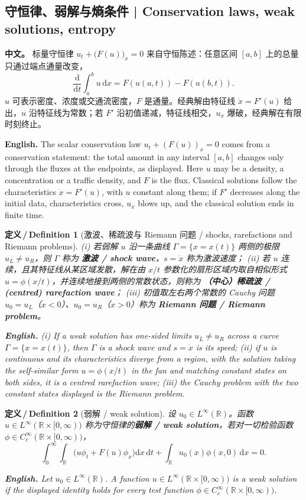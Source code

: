 \documentclass[UTF8,11pt,a4paper]{ctexart}
\newcommand{\APS}[2]{\par\noindent\textbf{中文。} #1\par\noindent\textbf{English.} #2\par\smallskip}
\newcommand{\EN}[1]{\par\noindent \textbf{English.} #1\par}
\newtheorem{definition}{定义\,/\,Definition}[section]
\newcommand{\R}{\mathbb{R}}
\newcommand{\dd}{\mathrm{d}}
\begin{document}
\subsection{守恒律、弱解与熵条件 | Conservation laws, weak solutions, entropy}
\APS{标量守恒律 $u_t+\bigl(F(u)\bigr)_x=0$ 来自守恒陈述：任意区间 $[a,b]$ 上的总量只通过端点通量改变，
\[
\frac{\dd}{\dd t}\int_a^b u\,\dd x=F(u(a,t))-F(u(b,t)).
\]
$u$ 可表示密度、浓度或交通流密度，$F$ 是通量。经典解由特征线 $\dot x=F'(u)$ 给出，$u$ 沿特征线为常数；若 $F'$ 沿初值递减，特征线相交，$u_x$ 爆破，经典解在有限时刻终止。}{The scalar conservation law $u_t+(F(u))_x=0$ comes from a conservation statement: the total amount in any interval $[a,b]$ changes only through the fluxes at the endpoints, as displayed. Here $u$ may be a density, a concentration or a traffic density, and $F$ is the flux. Classical solutions follow the characteristics $\dot x=F'(u)$, with $u$ constant along them; if $F'$ decreases along the initial data, characteristics cross, $u_x$ blows up, and the classical solution ends in finite time.}

\begin{definition}[激波、稀疏波与 Riemann 问题 / shocks, rarefactions and Riemann problems]\label{def:shock}
(i) 若弱解 $u$ 沿一条曲线 $\Gamma=\{x=x(t)\}$ 两侧的极限 $u_L\ne u_R$，则 $\Gamma$ 称为 \textbf{激波 / shock wave}，$s=\dot x$ 称为激波速度；
(ii) 若 $u$ 连续，且其特征线从某区域发散，解在由 $x/t$ 参数化的扇形区域内取自相似形式 $u=\phi(x/t)$，并连续地接到两侧的常数状态，则称为 \textbf{（中心）稀疏波 / (centred) rarefaction wave}；
(iii) 初值取左右两个常数的 Cauchy 问题 $u_0=u_L$（$x<0$）、$u_0=u_R$（$x>0$）称为 \textbf{Riemann 问题 / Riemann problem}。
\EN{(i) If a weak solution has one-sided limits $u_L\ne u_R$ across a curve $\Gamma=\{x=x(t)\}$, then $\Gamma$ is a shock wave and $s=\dot x$ is its speed; (ii) if $u$ is continuous and its characteristics diverge from a region, with the solution taking the self-similar form $u=\phi(x/t)$ in the fan and matching constant states on both sides, it is a centred rarefaction wave; (iii) the Cauchy problem with the two constant states displayed is the Riemann problem.}
\end{definition}

\begin{definition}[弱解 / weak solution]\label{def:weak}
设 $u_0\in L^\infty(\R)$。函数 $u\in L^\infty(\R\times[0,\infty))$ 称为守恒律的\textbf{弱解 / weak solution}，若对一切检验函数 $\phi\in C^\infty_c(\R\times[0,\infty))$，
\[
\int_0^\infty\!\!\int_\R\bigl(u\phi_t+F(u)\phi_x\bigr)\dd x\,\dd t+\int_\R u_0(x)\phi(x,0)\,\dd x=0 .
\]
\EN{Let $u_0\in L^\infty(\R)$. A function $u\in L^\infty(\R\times[0,\infty))$ is a weak solution if the displayed identity holds for every test function $\phi\in C^\infty_c(\R\times[0,\infty))$.}
\end{definition}
\end{document}
